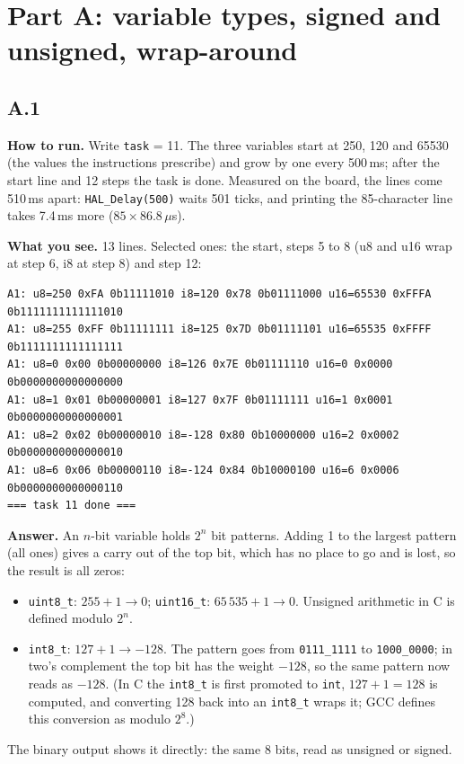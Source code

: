 \documentclass[11pt,a4paper]{article}
\newcommand{\lv}[1]{\texttt{#1}}                 %
\newcommand{\run}[1]{\textbf{How to run.} #1}
\newcommand{\see}[1]{\textbf{What you see.} #1}
\begin{document}
\section{Part A: variable types, signed and unsigned, wrap-around}

\subsection*{A.1}
\run{Write \lv{task} = 11. The three variables start at 250, 120 and 65530 (the
values the instructions prescribe) and grow by one every 500\,ms; after the start line and 12 steps the task is done.
Measured on the board, the lines come 510\,ms apart: \texttt{HAL\_Delay(500)} waits 501 ticks, and printing the
85-character line takes 7.4\,ms more ($85 \times 86.8\,\mu$s).}

\see{13 lines. Selected ones: the start, steps 5 to 8 (u8 and u16 wrap at step 6, i8 at step 8) and step 12:}
\begin{lstlisting}[language={},basicstyle=\ttfamily\scriptsize]
A1: u8=250 0xFA 0b11111010 i8=120 0x78 0b01111000 u16=65530 0xFFFA 0b1111111111111010
A1: u8=255 0xFF 0b11111111 i8=125 0x7D 0b01111101 u16=65535 0xFFFF 0b1111111111111111
A1: u8=0 0x00 0b00000000 i8=126 0x7E 0b01111110 u16=0 0x0000 0b0000000000000000
A1: u8=1 0x01 0b00000001 i8=127 0x7F 0b01111111 u16=1 0x0001 0b0000000000000001
A1: u8=2 0x02 0b00000010 i8=-128 0x80 0b10000000 u16=2 0x0002 0b0000000000000010
A1: u8=6 0x06 0b00000110 i8=-124 0x84 0b10000100 u16=6 0x0006 0b0000000000000110
=== task 11 done ===
\end{lstlisting}

\textbf{Answer.} An $n$-bit variable holds $2^n$ bit patterns. Adding 1 to the largest pattern (all ones) gives a
carry out of the top bit, which has no place to go and is lost, so the result is all zeros:
\begin{itemize}
  \item \texttt{uint8\_t}: $255 + 1 \to 0$; \texttt{uint16\_t}: $65\,535 + 1 \to 0$. Unsigned arithmetic in C is
        defined modulo $2^n$.
  \item \texttt{int8\_t}: $127 + 1 \to -128$. The pattern goes from \texttt{0111\_1111} to \texttt{1000\_0000}; in two's
        complement the top bit has the weight $-128$, so the same pattern now reads as $-128$. (In C the
        \texttt{int8\_t} is first promoted to \texttt{int}, $127 + 1 = 128$ is computed, and converting 128 back into an
        \texttt{int8\_t} wraps it; GCC defines this conversion as modulo $2^8$.)
\end{itemize}
The binary output shows it directly: the same 8 bits, read as unsigned or signed.
\end{document}
